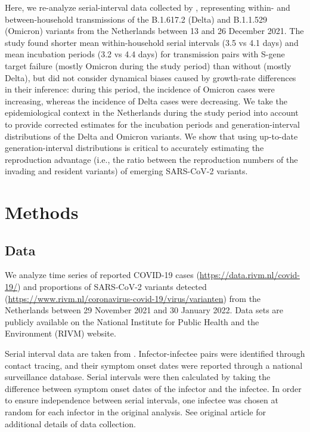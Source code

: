 \documentclass[12pt]{article}
\begin{document}
Here, we re-analyze serial-interval data collected by \citep{backer2021omicron}, representing within- and between-household transmissions of the B.1.617.2 (Delta) and B.1.1.529 (Omicron) variants from the Netherlands between 13 and 26 December 2021.
The study found shorter mean within-household serial intervals (3.5 vs 4.1 days) and mean incubation periods (3.2 vs 4.4 days) for transmission pairs with S-gene target failure (mostly Omicron during the study period) than without (mostly Delta), but did not consider dynamical biases caused by growth-rate differences in their inference:
during this period, the incidence of Omicron cases were increasing, whereas the incidence of Delta cases were decreasing.
We take the epidemiological context in the Netherlands during the study period into account to provide corrected estimates for the incubation periods and generation-interval distributions of the Delta and Omicron variants.
We show that using up-to-date generation-interval distributions is critical to accurately estimating the reproduction advantage (i.e., the ratio between the reproduction numbers of the invading and resident variants) of emerging SARS-CoV-2 variants.

\section{Methods}

\subsection{Data}

We analyze time series of reported COVID-19 cases (\url{https://data.rivm.nl/covid-19/}) and proportions of SARS-CoV-2 variants detected (\url{https://www.rivm.nl/coronavirus-covid-19/virus/varianten}) from the Netherlands between 29 November 2021 and 30 January 2022.
Data sets are publicly available on the National Institute for Public Health and the Environment (RIVM) website.

Serial interval data are taken from \cite{backer2021omicron}.
Infector-infectee pairs were identified through contact tracing, and their symptom onset dates were reported through a national surveillance database.
Serial intervals were then calculated by taking the difference between symptom onset dates of the infector and the infectee.
In order to ensure independence between serial intervals, one infectee was chosen at random for each infector in the original analysis.
See original article for additional details of data collection.
\end{document}
